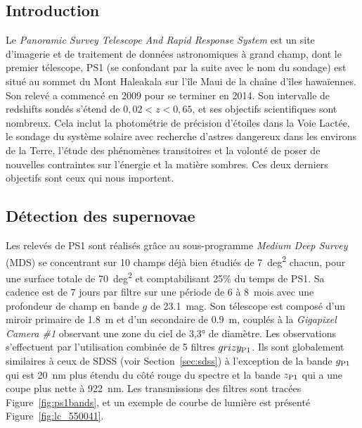 \documentclass[../main/main.tex]{subfiles}
\begin{document}
\subsection{Introduction}\label{ssec:ps1intro}

Le \textit{Panoramic Survey Telescope And Rapid Response System}
\citep[Pan-STARRS,][]{chambers2016, scolnic2018} est un site d'imagerie et de
traitement de données astronomiques à grand champ, dont le premier télescope,
PS1 (se confondant par la suite avec le nom du sondage) est situé au sommet du
Mont Haleakala sur l'île Maui de la chaîne d'îles hawaïennes. Son relevé a
commencé en 2009 pour se terminer en 2014. Son intervalle de redshifts sondés
s'étend de $0,02 < z < 0,65$, et ses objectifs scientifiques sont nombreux. Cela
inclut la photométrie de précision d'étoiles dans la Voie Lactée, le sondage du
système solaire avec recherche d'astres dangereux dans les environs de la Terre,
l'étude des phénomènes transitoires et la volonté de poser de nouvelles
contraintes sur l'énergie et la matière sombres. Ces deux derniers objectifs
sont ceux qui nous importent. 

\subsection{Détection des supernovae}\label{ssec:ps1detec}

Les relevés de PS1 sont réalisés grâce au sous-programme \textit{Medium Deep
Survey} (MDS) se concentrant sur 10 champs déjà bien étudiés de \SI{7}{deg^2}
chacun, pour une surface totale de \SI{70}{deg^2} et comptabilisant 25\% du
temps de PS1. Sa cadence est de 7 jours par filtre sur une période de 6 à
\SI{8}{mois} avec une profondeur de champ en bande $g$ de \SI{23,1}{mag}. Son
télescope \citep{hodapp2004} est composé d'un miroir primaire de \SI{1,8}{m} et
d'un secondaire de \SI{0,9}{m}, couplés à la \textit{Gigapixel Camera \#1}
\citep[GPC1,][]{kaiser2010, tonry2006} observant une zone du ciel de \ang{3,3;;}
de diamètre. Les observations s'effectuent par l'utilisation combinée de 5
filtres $grizy_{\rm P1}$. Ils sont globalement similaires à ceux de SDSS (voir
Section~\ref{sec:sdss}) à l'exception de la bande $g_{\rm P1}$ qui est
\SI{20}{nm} plus étendu du côté rouge du spectre et la bande $z_{\rm P1}$ qui a
une coupe plus nette à \SI{922}{nm}. Les transmissions des filtres sont tracées
Figure~\ref{fig:ps1bands}, et un exemple de courbe de lumière est présenté
Figure~\ref{fig:lc_550041}.
\end{document}
